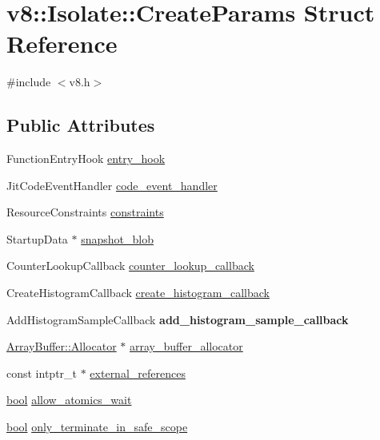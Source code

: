 \hypertarget{structv8_1_1Isolate_1_1CreateParams}{}\section{v8\+:\+:Isolate\+:\+:Create\+Params Struct Reference}
\label{structv8_1_1Isolate_1_1CreateParams}


{\ttfamily \#include $<$v8.\+h$>$}

\subsection*{Public Attributes}
\begin{DoxyCompactItemize}
\item 
Function\+Entry\+Hook \mbox{\hyperlink{structv8_1_1Isolate_1_1CreateParams_aa7aa18bbe2d86713e5b074a93b38dc60}{entry\+\_\+hook}}
\item 
Jit\+Code\+Event\+Handler \mbox{\hyperlink{structv8_1_1Isolate_1_1CreateParams_a783e3eba90ce6e2800bdd69197bbccdd}{code\+\_\+event\+\_\+handler}}
\item 
Resource\+Constraints \mbox{\hyperlink{structv8_1_1Isolate_1_1CreateParams_a2c570b306aa8c1c24cfe70e8eee50fa1}{constraints}}
\item 
Startup\+Data $\ast$ \mbox{\hyperlink{structv8_1_1Isolate_1_1CreateParams_a25d38476e4dec79ae96c59292eee4a64}{snapshot\+\_\+blob}}
\item 
Counter\+Lookup\+Callback \mbox{\hyperlink{structv8_1_1Isolate_1_1CreateParams_a10441abadd0b83a938303c92e7444fb6}{counter\+\_\+lookup\+\_\+callback}}
\item 
Create\+Histogram\+Callback \mbox{\hyperlink{structv8_1_1Isolate_1_1CreateParams_a11acf5fb9cdbc4c8bf15baf542507b49}{create\+\_\+histogram\+\_\+callback}}
\item 
\mbox{\label{structv8_1_1Isolate_1_1CreateParams_a3e0fb886996eb1f498b6cc157e11e280}} 
Add\+Histogram\+Sample\+Callback {\bfseries add\+\_\+histogram\+\_\+sample\+\_\+callback}
\item 
\mbox{\hyperlink{classv8_1_1ArrayBuffer_1_1Allocator}{Array\+Buffer\+::\+Allocator}} $\ast$ \mbox{\hyperlink{structv8_1_1Isolate_1_1CreateParams_a7c663f70b64290392eeaf164f57585f9}{array\+\_\+buffer\+\_\+allocator}}
\item 
const intptr\+\_\+t $\ast$ \mbox{\hyperlink{structv8_1_1Isolate_1_1CreateParams_a89b8c9dc74efbdcd93ab5786eae6fe19}{external\+\_\+references}}
\item 
\mbox{\hyperlink{classbool}{bool}} \mbox{\hyperlink{structv8_1_1Isolate_1_1CreateParams_acade19de0f78ff15d76aaef2e292da72}{allow\+\_\+atomics\+\_\+wait}}
\item 
\mbox{\hyperlink{classbool}{bool}} \mbox{\hyperlink{structv8_1_1Isolate_1_1CreateParams_af44a854a07944452589128b6cf3b9958}{only\+\_\+terminate\+\_\+in\+\_\+safe\+\_\+scope}}
\end{DoxyCompactItemize}



